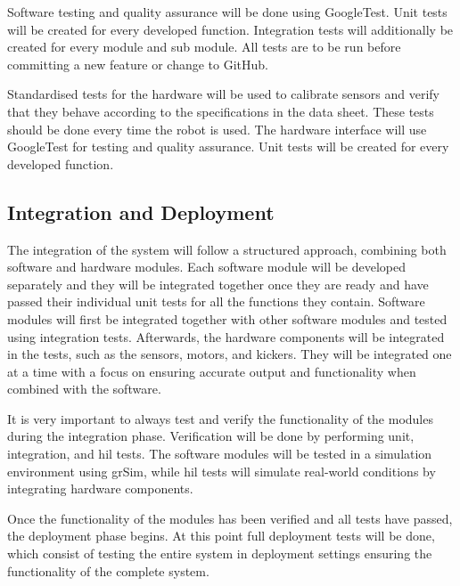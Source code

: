 Software testing and quality assurance will be done using GoogleTest. Unit tests will be created for every developed function. Integration tests will additionally be created for every module and sub module. All tests are to be run before committing a new feature or change to GitHub.

Standardised tests for the hardware will be used to calibrate sensors and verify that they behave according to the specifications in the data sheet. These tests should be done every time the robot is used. The hardware interface will use GoogleTest for testing and quality assurance. Unit tests will be created for every developed function.



\subsection{Integration and Deployment}
\label{subsection:integration_and_deployment}

The integration of the system will follow a structured approach, combining both software and hardware modules. 
Each software module will be developed separately and they will be integrated together once they are ready and have passed their individual unit tests for all the functions they contain. Software modules will first be integrated together with other software modules and tested using integration tests. Afterwards, the hardware components will be integrated in the tests, such as the sensors, motors, and kickers. They will be integrated one at a time with a focus on ensuring accurate output and functionality when combined with the software. 

It is very important to always test and verify the functionality of the modules during the integration phase. Verification will be done by performing unit, integration, and \ac{hil} tests. 
The software modules will be tested in a simulation environment using grSim, while \ac{hil} tests will simulate real-world conditions by integrating hardware components. 

Once the functionality of the modules has been verified and all tests have passed, the deployment phase begins. At this point full deployment tests will be done, which consist of testing the entire system in deployment settings ensuring the functionality of the complete system.



